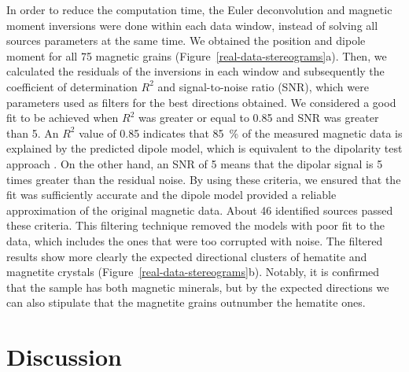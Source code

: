 In order to reduce the computation time, the Euler deconvolution and magnetic moment inversions were done within each data window, instead of solving all sources parameters at the same time. We obtained the position and dipole moment for all 75 magnetic grains (Figure~\ref{real-data-stereograms}a). Then, we calculated the residuals of the inversions in each window and subsequently the coefficient of determination $R^2$ and signal-to-noise ratio (SNR), which were parameters used as filters for the best directions obtained. We considered a good fit to be achieved when $R^2$ was greater or equal to 0.85 and SNR was greater than 5. An $R^2$ value of 0.85 indicates that \qty{85}{\percent} of the measured magnetic data is explained by the predicted dipole model, which is equivalent to the dipolarity test approach \citep{Fu2020}. On the other hand, an SNR of 5 means that the dipolar signal is 5 times greater than the residual noise. By using these criteria, we ensured that the fit was sufficiently accurate and the dipole model provided a reliable approximation of the original magnetic data. About 46 identified sources passed these criteria. This filtering technique removed the models with poor fit to the data, which includes the ones that were too corrupted with noise. The filtered results show more clearly the expected directional clusters of hematite and magnetite crystals (Figure~\ref{real-data-stereograms}b). Notably, it is confirmed that the sample has both magnetic minerals, but by the expected directions we can also stipulate that the magnetite grains outnumber the hematite ones.

\section{Discussion}

